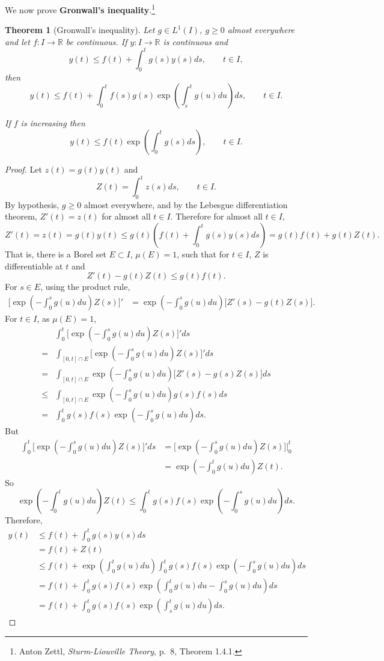 \documentclass{article}
\newtheorem{theorem}{Theorem}
\theoremstyle{definition}
\begin{document}
We now prove \textbf{Gronwall's inequality}.\footnote{Anton Zettl, {\em Sturm-Liouville Theory},
p.~8, Theorem 1.4.1.}

\begin{theorem}[Gronwall's inequality]
Let $g \in L^1(I)$, $g \geq 0$ almost everywhere and let $f:I \to \mathbb{R}$ be continuous. If $y:I \to \mathbb{R}$ is continuous and
\[
y(t) \leq f(t) + \int_0^t g(s) y(s) ds,\qquad t \in I,
\]
then 
\[
y(t) \leq f(t) + \int_0^t f(s) g(s) \exp\left(\int_s^t g(u) du\right) ds,\qquad t \in I.
\]

If $f$ is increasing then 
\[
y(t) \leq f(t) \exp\left(\int_0^t g(s) ds\right),\qquad t \in I.
\]
\end{theorem}
\begin{proof}
Let $z(t)=g(t) y(t)$ and 
\[
Z(t) = \int_0^t z(s) ds,\qquad t \in I.
\]
By hypothesis,
$g \geq 0$ almost everywhere, and by the Lebesgue differentiation theorem,
$Z'(t)=z(t)$ for almost all $t \in I$. Therefore for almost all $t \in I$, 
\[
Z'(t) = z(t) = g(t)y(t) \leq g(t)\left(f(t) + \int_0^t g(s) y(s) ds\right)
=g(t)f(t) + g(t)Z(t).
\]
That is, there is a Borel set $E \subset I$, $\mu(E) = 1$, such that for $t \in I$,
$Z$ is differentiable at $t$ and
\[
Z'(t) - g(t)Z(t) \leq g(t) f(t).
\]
For $s \in E$, using the product rule,
\begin{align*}
\bigg[ \exp\left(-\int_0^s g(u) du\right) Z(s) \bigg]'&=
\exp\left(-\int_0^s g(u) du\right) \bigg[Z'(s) - g(t)Z(s)\bigg].
\end{align*}
For $t \in I$, as $\mu(E)=1$,
\[
\begin{split}
&\int_0^t \bigg[ \exp\left(-\int_0^s g(u) du\right) Z(s) \bigg]' ds\\
=&\int_{[0,t] \cap E} \bigg[ \exp\left(-\int_0^s g(u) du\right) Z(s) \bigg]' ds\\
=&\int_{[0,t] \cap E} \exp\left(-\int_0^s g(u) du\right) \bigg[Z'(s) - g(s)Z(s)\bigg] ds\\
\leq&\int_{[0,t] \cap E}  \exp\left(-\int_0^s g(u) du\right) g(s) f(s) ds\\
=&\int_0^t g(s) f(s)  \exp\left(-\int_0^s g(u) du\right) ds.
\end{split}
\]
But
\begin{align*}
\int_0^t \bigg[ \exp\left(-\int_0^s g(u) du\right) Z(s) \bigg]' ds
&= \bigg[ \exp\left(-\int_0^s g(u) du\right) Z(s) \bigg]\bigg|_0^t\\
&=\exp\left(-\int_0^t g(u) du\right) Z(t).
\end{align*}
So
\[
\exp\left(-\int_0^t g(u) du\right) Z(t) \leq \int_0^t g(s) f(s)  \exp\left(-\int_0^s g(u) du\right) ds.
\]
Therefore,
\begin{align*}
y(t) &\leq f(t) + \int_0^t g(s) y(s) ds\\
&=f(t)+Z(t)\\
&\leq f(t)+ \exp\left(\int_0^t g(u) du\right) \int_0^t g(s) f(s)  \exp\left(-\int_0^s g(u) du\right) ds\\
&=f(t) + \int_0^t g(s) f(s) \exp\left(\int_0^t g(u) du-\int_0^s g(u) du\right) ds\\
&=f(t) + \int_0^t g(s) f(s) \exp\left(\int_s^t g(u) du\right) ds.
\end{align*}



\end{proof}
\end{document}
